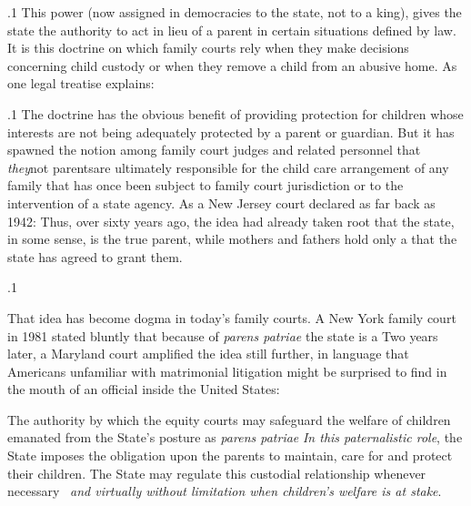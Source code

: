 \documentclass[11pt, twoside]{article}
\begin{document}
{\p.1{%
This power (now assigned in democracies to the state, not to a king),
gives the state the authority to act in lieu of a parent in certain situations defined by law. It is this doctrine on which family courts rely when
they make decisions concerning child custody  or when they remove a child from an abusive home. As one legal
treatise explains: 
}%

\p.1{%
The doctrine has the obvious benefit of providing protection for children whose interests are not being adequately protected by a parent or
guardian. But it has spawned the notion among family court judges and
related personnel that \textit{they}\mdash{}not parents\mdash{}are ultimately responsible for
the child care arrangement of any family that has once been subject to
family court jurisdiction or to the intervention of a state agency. As a
New Jersey court declared as far back as 1942:  Thus, over sixty years ago, the idea had already taken
root that the state, in some sense, is the true parent, while mothers and
fathers hold only a  that the state has agreed to grant them.
}%

\p.1{%
That idea has become dogma in today’s family courts. A New York
family court in 1981 stated bluntly that because of \textit{parens patriae} the
state is a  Two years later, a Maryland court amplified
the idea still further, in language that Americans unfamiliar with matrimonial litigation might be surprised to find in the mouth of an official
inside the United States:

\begin{blockQuote}
The authority by which the equity courts may safeguard the welfare
of children emanated from the State’s posture as \textit{parens patriae}\ellFour{2pt}{2pt}
\textit{In this paternalistic role}, the State imposes the obligation upon the
parents to maintain, care for and protect their children. The State
may regulate this custodial relationship whenever necessary \ellThree{2pt}{2pt}\
\textit{and virtually without limitation when children’s welfare is at stake}.
\end{blockQuote}

}}
\end{document}
